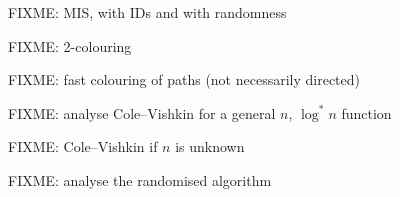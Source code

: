 FIXME: MIS, with IDs and with randomness

FIXME: 2-colouring

\begin{ex}\label{ex:intro-undir-path}
    FIXME: fast colouring of paths (not necessarily directed)
\end{ex}

FIXME: analyse Cole--Vishkin for a general $n$, $\log^* n$ function

FIXME: Cole--Vishkin if $n$ is unknown

FIXME: analyse the randomised algorithm
